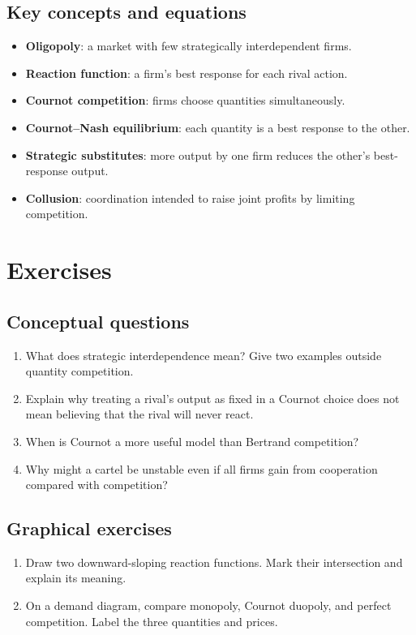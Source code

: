 \subsection*{Key concepts and equations}
\begin{itemize}
  \item \textbf{Oligopoly}: a market with few strategically interdependent firms.
  \item \textbf{Reaction function}: a firm's best response for each rival action.
  \item \textbf{Cournot competition}: firms choose quantities simultaneously.
  \item \textbf{Cournot--Nash equilibrium}: each quantity is a best response to the other.
  \item \textbf{Strategic substitutes}: more output by one firm reduces the other's best-response output.
  \item \textbf{Collusion}: coordination intended to raise joint profits by limiting competition.
\end{itemize}

\section*{Exercises}

\subsection*{Conceptual questions}
\begin{enumerate}[label=\arabic*.]
  \item What does strategic interdependence mean? Give two examples outside quantity competition.
  \item Explain why treating a rival's output as fixed in a Cournot choice does not mean believing that the rival will never react.
  \item When is Cournot a more useful model than Bertrand competition?
  \item Why might a cartel be unstable even if all firms gain from cooperation compared with competition?
\end{enumerate}

\subsection*{Graphical exercises}
\begin{enumerate}[resume,label=\arabic*.]
  \item Draw two downward-sloping reaction functions. Mark their intersection and explain its meaning.
  \item On a demand diagram, compare monopoly, Cournot duopoly, and perfect competition. Label the three quantities and prices.
\end{enumerate}

